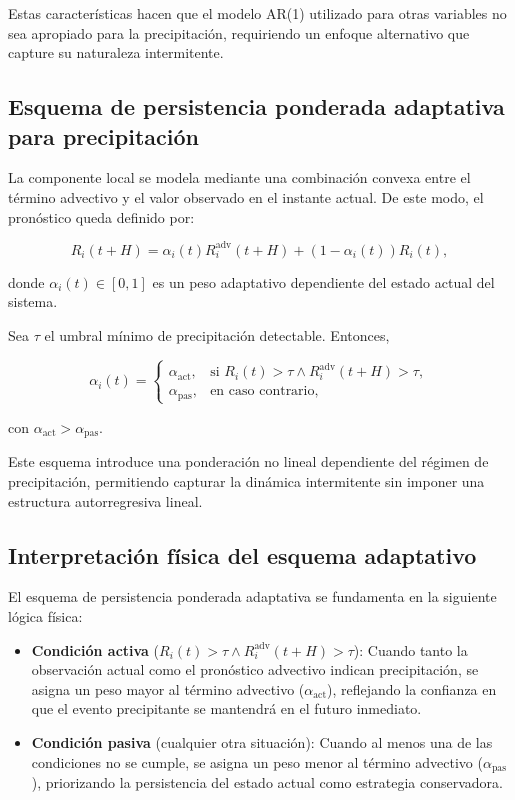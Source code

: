 \documentclass[
  spanish,
  us-letterpaper,
]{scrreprt}
\numberwithin{equation}{section}
\begin{document}
Estas características hacen que el modelo AR(1) utilizado para otras
variables no sea apropiado para la precipitación, requiriendo un enfoque
alternativo que capture su naturaleza intermitente.

\subsection{Esquema de persistencia ponderada adaptativa para
precipitación}\label{esquema-de-persistencia-ponderada-adaptativa-para-precipitaciuxf3n}

La componente local se modela mediante una combinación convexa entre el
término advectivo y el valor observado en el instante actual. De este
modo, el pronóstico queda definido por:

\[
R_i(t+H) = \alpha_i(t) R_i^{\text{adv}}(t+H) + (1-\alpha_i(t)) R_i(t),
\]

donde \(\alpha_i(t) \in [0,1]\) es un peso adaptativo dependiente del
estado actual del sistema.

Sea \(\tau\) el umbral mínimo de precipitación detectable. Entonces,

\[
\alpha_i(t) =
\begin{cases}
\alpha_{\text{act}}, & \text{si } R_i(t) > \tau \land R_i^{\text{adv}}(t+H) > \tau, \\
\alpha_{\text{pas}}, & \text{en caso contrario},
\end{cases}
\]

con \(\alpha_{\text{act}} > \alpha_{\text{pas}}\).

Este esquema introduce una ponderación no lineal dependiente del régimen
de precipitación, permitiendo capturar la dinámica intermitente sin
imponer una estructura autorregresiva lineal.

\subsection{Interpretación física del esquema
adaptativo}\label{interpretaciuxf3n-fuxedsica-del-esquema-adaptativo}

El esquema de persistencia ponderada adaptativa se fundamenta en la
siguiente lógica física:

\begin{itemize}
\item
  \textbf{Condición activa}
  (\(R_i(t) > \tau \land R_i^{\text{adv}}(t+H) > \tau\)): Cuando tanto
  la observación actual como el pronóstico advectivo indican
  precipitación, se asigna un peso mayor al término advectivo
  (\(\alpha_{\text{act}}\)), reflejando la confianza en que el evento
  precipitante se mantendrá en el futuro inmediato.
\item
  \textbf{Condición pasiva} (cualquier otra situación): Cuando al menos
  una de las condiciones no se cumple, se asigna un peso menor al
  término advectivo (\(\alpha_{\text{pas}}\)), priorizando la
  persistencia del estado actual como estrategia conservadora.
\end{itemize}
\end{document}
